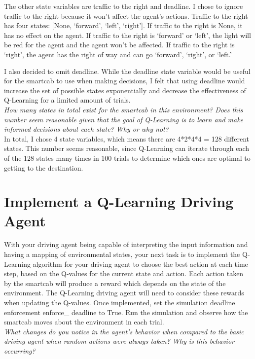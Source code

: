 \documentclass[11pt]{article}
\begin{document}
The other state variables are traffic to the right and deadline. I chose to ignore traffic to the right because it won’t affect the agent’s actions. Traffic to the right has four states: [None, ‘forward’, ‘left’, ‘right’]. If traffic to the right is None, it has no effect on the agent. If traffic to the right is ‘forward’ or ‘left', the light will be red for the agent and the agent won’t be affected. If traffic to the right is ‘right’, the agent has the right of way and can go ‘forward’, ‘right’, or ‘left.'

I also decided to omit deadline. While the deadline state variable would be useful for the smartcab to use when making decisions, I felt that using deadline would increase the set of possible states exponentially and decrease the effectiveness of Q-Learning for a limited amount of trials.\\

\textit{How many states in total exist for the smartcab in this environment? Does this number seem reasonable given that the goal of Q-Learning is to learn and make informed decisions about each state? Why or why not?}\\

In total, I chose 4 state variables, which means there are 4*2*4*4 = 128 different states. This number seems reasonable, since Q-Learning can iterate through each of the 128 states many times in 100 trials to determine which ones are optimal to getting to the destination.\\

\section{Implement a Q-Learning Driving Agent}

With your driving agent being capable of interpreting the input information and having a mapping of environmental states, your next task is to implement the Q-Learning algorithm for your driving agent to choose the best action at each time step, based on the Q-values for the current state and action. Each action taken by the smartcab will produce a reward which depends on the state of the environment. The Q-Learning driving agent will need to consider these rewards when updating the Q-values. Once implemented, set the simulation deadline enforcement enforce\_ deadline to True. Run the simulation and observe how the smartcab moves about the environment in each trial.\\

\textit{What changes do you notice in the agent's behavior when compared to the basic driving agent when random actions were always taken? Why is this behavior occurring?}\\
\end{document}
